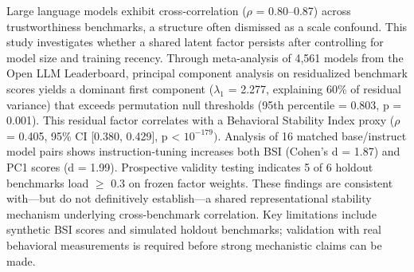 
Large language models exhibit cross-correlation ($\rho$ = 0.80--0.87) across trustworthiness benchmarks, a structure often dismissed as a scale confound. This study investigates whether a shared latent factor persists after controlling for model size and training recency. Through meta-analysis of 4,561 models from the Open LLM Leaderboard, principal component analysis on residualized benchmark scores yields a dominant first component ($\lambda _1$ = 2.277, explaining 60\% of residual variance) that exceeds permutation null thresholds (95th percentile = 0.803, p = 0.001). This residual factor correlates with a Behavioral Stability Index proxy ($\rho$ = 0.405, 95\% CI [0.380, 0.429], p < $10^{-179})$. Analysis of 16 matched base/instruct model pairs shows instruction-tuning increases both BSI (Cohen's d = 1.87) and PC1 scores (d = 1.99). Prospective validity testing indicates 5 of 6 holdout benchmarks load $\geq$ 0.3 on frozen factor weights. These findings are consistent with---but do not definitively establish---a shared representational stability mechanism underlying cross-benchmark correlation. Key limitations include synthetic BSI scores and simulated holdout benchmarks; validation with real behavioral measurements is required before strong mechanistic claims can be made.
